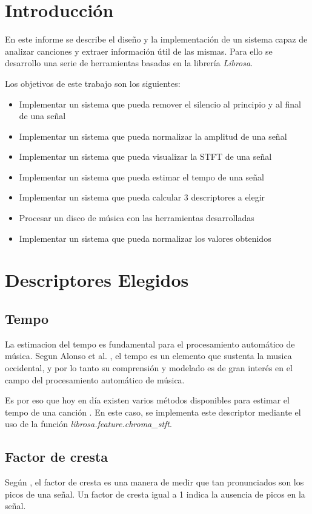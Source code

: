 \documentclass[]{article}
\begin{document}
\begin{multicols}{2}
\section{Introducción}
\label{sec: intro}
En este informe se describe el diseño y la implementación de un sistema capaz de
analizar canciones y extraer información útil de las mismas. Para ello se desarrollo
una serie de herramientas basadas en la librería \textit{Librosa}.

Los objetivos de este trabajo son los siguientes:
\begin{itemize}
  \item Implementar un sistema que pueda remover el silencio al principio y al final de una señal
  \item Implementar un sistema que pueda normalizar la amplitud de una señal
  \item Implementar un sistema que pueda visualizar la STFT de una señal
  \item Implementar un sistema que pueda estimar el tempo de una señal
  \item Implementar un sistema que pueda calcular 3 descriptores a elegir
  \item Procesar un disco de música con las herramientas desarrolladas
  \item Implementar un sistema que pueda normalizar los valores obtenidos
\end{itemize}

\section{Descriptores Elegidos}

\subsection{Tempo}
La estimacion del tempo es fundamental para el procesamiento automático de música.
Segun Alonso et al. \cite{alonso2004tempo}, el tempo es un elemento que sustenta
la musica occidental, y por lo tanto su comprensión y modelado es de gran interés
en el campo del procesamiento automático de música.

Es por eso que hoy en día existen varios métodos disponibles para estimar el tempo
de una canción \cite{goto1997issues}. En este caso, se implementa este descriptor
mediante el uso de la función \emph{{librosa.feature.chroma\_stft}}.
\subsection{Factor de cresta}
Según \cite{ wiki:crest}{}, el factor de cresta es una manera de medir que tan
pronunciados son los picos de una señal. Un factor de cresta igual a 1 indica
la ausencia de picos en la señal.


\end{multicols}
\end{document}
